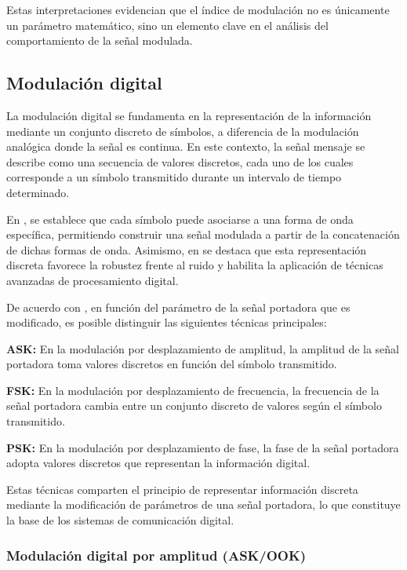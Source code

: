 Estas interpretaciones evidencian que el índice de modulación no es únicamente un parámetro matemático, sino un elemento clave en el análisis del comportamiento de la señal modulada.

\subsection{Modulación digital}

La modulación digital se fundamenta en la representación de la información mediante un conjunto discreto de símbolos, a diferencia de la modulación analógica donde la señal es continua. En este contexto, la señal mensaje se describe como una secuencia de valores discretos, cada uno de los cuales corresponde a un símbolo transmitido durante un intervalo de tiempo determinado.

En \cite{proakis2007digital}, se establece que cada símbolo puede asociarse a una forma de onda específica, permitiendo construir una señal modulada a partir de la concatenación de dichas formas de onda. Asimismo, en \cite{haykin2001} se destaca que esta representación discreta favorece la robustez frente al ruido y habilita la aplicación de técnicas avanzadas de procesamiento digital.

De acuerdo con \cite{proakis2007digital}, en función del parámetro de la señal portadora que es modificado, es posible distinguir las siguientes técnicas principales:

\textbf{ASK:} En la modulación por desplazamiento de amplitud, la amplitud de la señal portadora toma valores discretos en función del símbolo transmitido.

\textbf{FSK:} En la modulación por desplazamiento de frecuencia, la frecuencia de la señal portadora cambia entre un conjunto discreto de valores según el símbolo transmitido.

\textbf{PSK:} En la modulación por desplazamiento de fase, la fase de la señal portadora adopta valores discretos que representan la información digital.

Estas técnicas comparten el principio de representar información discreta mediante la modificación de parámetros de una señal portadora, lo que constituye la base de los sistemas de comunicación digital.

\subsubsection{Modulación digital por amplitud (ASK/OOK)}

